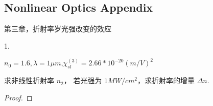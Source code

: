 \subsection{Nonlinear Optics Appendix}

第三章，折射率岁光强改变的效应

\begin{exercise}

1. 

$n_0=1.6,\lambda = 1\mu m$,$ \chi_{sl}^{(3)}=2.66*10^{-20} (m/V)^2$

求非线性折射率 $n_2$， 若光强为 $1MW/cm^2$，求折射率的增量 $\Delta n$.

\end{exercise}

\begin{proof}

\end{proof}

